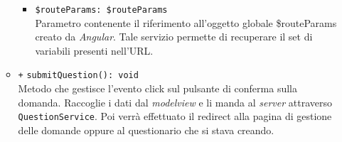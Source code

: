 \begin{itemize}
\begin{itemize}
\begin{itemize}
			\item \texttt{\$routeParams: \$routeParams} \\
			Parametro contenente il riferimento all'oggetto globale \$routeParams creato da \textit{Angular}. Tale servizio permette di recuperare il set di variabili presenti nell'URL.
		\end{itemize}
		\item \texttt{+} \texttt{submitQuestion(): void}\\ 
		Metodo che gestisce l'evento click sul pulsante di conferma sulla domanda. Raccoglie i dati dal \textit{modelview} e li manda al \textit{server} attraverso \texttt{QuestionService}. Poi verrà effettuato il redirect alla pagina di gestione delle domande oppure al questionario che si stava creando. 
	\end{itemize}
\end{itemize}


